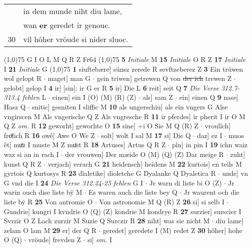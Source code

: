 \documentclass[8pt,a4paper,notitlepage]{article}
\begin{document}
\begin{table}[ht]
\begin{minipage}[t]{0.5\linewidth}
\begin{tabular}{rl}
 & in dem munde niht diu lame,\\ 
 & wan \textbf{er} geredet ir genouc.\\ 
30 & vil hôher vröude si nider sluoc.\\ 
\end{tabular}
\scriptsize
\line(1,0){75} \newline
G I O L M Q R Z Fr64 \newline
\line(1,0){75} \newline
\textbf{5} \textit{Initiale} M  \textbf{15} \textit{Initiale} O R Z  \textbf{17} \textit{Initiale} I  \textbf{21} \textit{Initiale} G  \newline
\line(1,0){75} \newline
\textbf{1} siuftebære] súnsz zerede R sevftzeberez Z \textbf{3} Ein trúwen wol gelopt R  $\cdot$ maget] man G  $\cdot$ gein triwen] getrewen Q von \sout{der ich} trewen Z  $\cdot$ gelobt] gelop I \textbf{4} ir] [sin]: ir G er R \textbf{5} ir] Die L \textbf{6} reit] seit Q \textbf{7} \textit{Die Verse 312.7-313.4 fehlen} L   $\cdot$ einen] ein I (O) (M) (R) (Z)  $\cdot$ als] sam Z  $\cdot$ ein] einen Q \textbf{9} nase] Hasz Q  $\cdot$ snitic] gesniten I sliffic M \textbf{10} als ungerschiu] als ein vngers G Alse vngirscen M Als vngerische Q Z Als vngresche R \textbf{11} ir pferdes] ir pherit I ir O M Q Z \textit{om.} R \textbf{12} geworht] geworhte O \textbf{15} sine] ÷i O Sie M Q (R) Z  $\cdot$ vroulîch] froͯlich R \textbf{16} owê] Awe O We Z  $\cdot$ solt] wolt I sal M \textbf{17} si] Die Q  $\cdot$ daz] ez I  $\cdot$ muos êt] muͤz I muste M Z muͦst R \textbf{18} Artuses] Artus Q R Z  $\cdot$ pîn] in pin I \textbf{19} ichn waiz waz si an in rach I  $\cdot$ der vrouwen] Der mæide O (M) (Q) (Z) Dar meige R  $\cdot$ zuht] kunst Q R Z  $\cdot$ verjach] verach G \textbf{21} heidensch] heidens M \textbf{22} kurtois] en teils M gyrtois Q kurtosys R \textbf{23} dîaletike] dioletche G Dyalanke Q Dyaletica R  $\cdot$ unde] vn G vnd die I \textbf{24} \textit{Die Verse 312.24-25 fehlen} G I   $\cdot$ Jr warn di liste bi O (Z)  $\cdot$ Jr warin ouch dise liste bÿ M  $\cdot$ Es waren auch die liste bey Q  $\cdot$ Jr waurent och die liste bẏ R \textbf{25} Von antromie O  $\cdot$ Von astronomie M Q (R) Z \textbf{26} si] si selb I  $\cdot$ Gundrie] kungri I kvndrie O (Q) (Z) kondrie M kondrye R \textbf{27} surzier] surscier I Svrzir O Z Lach zurzir M Suzie Q Surczir R \textbf{28} niht] was sie nicht M  $\cdot$ diu lame] zelam O lam M \textbf{29} er] der Q R  $\cdot$ geredet] geredete I (M) redet Z \textbf{30} hôher] hohe O (Q)  $\cdot$ vröude] frevden Z  $\cdot$ si] \textit{om.} I \newline

\end{minipage}
\end{table}
\end{document}
